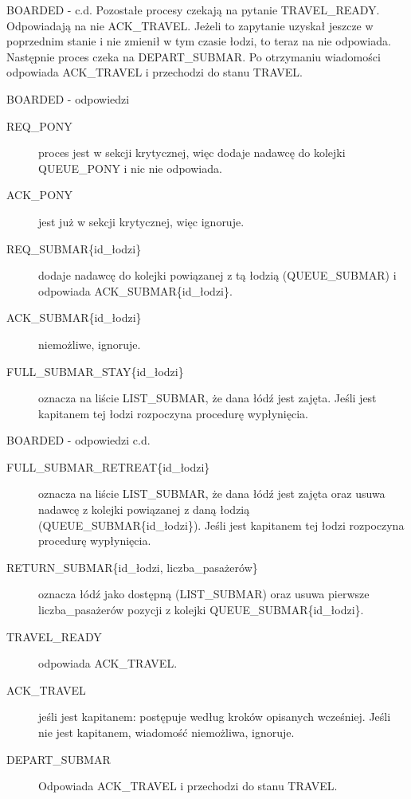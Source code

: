 \documentclass{beamer}
\begin{document}
\begin{frame}{BOARDED - c.d.}
    \internallinenumbers
    Pozostałe procesy czekają na pytanie TRAVEL\_READY. Odpowiadają na nie ACK\_TRAVEL. Jeżeli to zapytanie uzyskał jeszcze w poprzednim stanie i nie zmienił w tym czasie łodzi, to teraz na nie odpowiada. \\
    Następnie proces czeka na DEPART\_SUBMAR. Po otrzymaniu wiadomości odpowiada ACK\_TRAVEL i przechodzi do stanu TRAVEL.
\end{frame}

\begin{frame}{BOARDED - odpowiedzi}
    \internallinenumbers
    \resetlinenumber[1]
    \begin{description}
        \item [REQ\_PONY] proces jest w sekcji krytycznej, więc dodaje nadawcę do kolejki QUEUE\_PONY i nic nie odpowiada. 
        \item [ACK\_PONY] jest już w sekcji krytycznej, więc ignoruje.
        \item [REQ\_SUBMAR\{id\_łodzi\}] dodaje nadawcę do kolejki powiązanej z tą łodzią (QUEUE\_SUBMAR) i odpowiada ACK\_SUBMAR\{id\_łodzi\}.
        \item [ACK\_SUBMAR\{id\_łodzi\}] niemożliwe, ignoruje.
        \item [FULL\_SUBMAR\_STAY\{id\_łodzi\}] oznacza na liście LIST\_SUBMAR, że dana łódź jest zajęta. Jeśli jest kapitanem tej łodzi rozpoczyna procedurę wypłynięcia.

    \end{description}
\end{frame}

\begin{frame}{BOARDED - odpowiedzi c.d.}
    \internallinenumbers
    \begin{description}
        \item [FULL\_SUBMAR\_RETREAT\{id\_łodzi\}] oznacza na liście LIST\_SUBMAR, że dana łódź jest zajęta oraz usuwa nadawcę z kolejki powiązanej z daną łodzią (QUEUE\_SUBMAR\{id\_łodzi\}). Jeśli jest kapitanem tej łodzi rozpoczyna procedurę wypłynięcia.
        \item [RETURN\_SUBMAR\{id\_łodzi, liczba\_pasażerów\}] oznacza łódź jako dostępną (LIST\_SUBMAR) oraz usuwa pierwsze liczba\_pasażerów pozycji z kolejki QUEUE\_SUBMAR\{id\_łodzi\}.
        \item [TRAVEL\_READY] odpowiada ACK\_TRAVEL.
        \item [ACK\_TRAVEL] jeśli jest kapitanem: postępuje według kroków opisanych wcześniej. Jeśli nie jest kapitanem, wiadomość niemożliwa, ignoruje.
        \item [DEPART\_SUBMAR] Odpowiada ACK\_TRAVEL i przechodzi do stanu TRAVEL.
    \end{description}
\end{frame}
\end{document}

